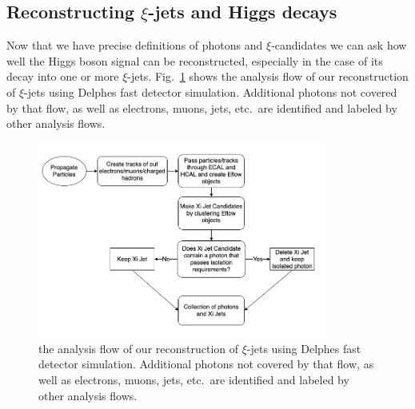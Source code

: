 \documentclass[letter,12pt]{article}
\begin{document}
\subsection{Reconstructing $\xi$-jets and Higgs decays}

Now that we have precise definitions of photons and $\xi$-candidates we can ask how well the Higgs boson signal can be reconstructed, especially in the case of its decay into one or more $\xi$-jets. Fig.~\ref{fig:flowchart} shows the analysis flow of our reconstruction of $\xi$-jets using Delphes fast detector simulation. Additional photons not covered by that flow, as well as electrons, muons, jets, etc.\ are identified and labeled by other analysis flows.

\begin{figure}[htbp]
\begin{center}
\includegraphics[width=0.85\textwidth]{flow.png}
\caption{the analysis flow of our reconstruction of $\xi$-jets using Delphes fast detector simulation. Additional photons not covered by that flow, as well as electrons, muons, jets, etc.\ are identified and labeled by other analysis flows. }
\label{fig:flowchart}
\end{center}
\end{figure}
\end{document}
